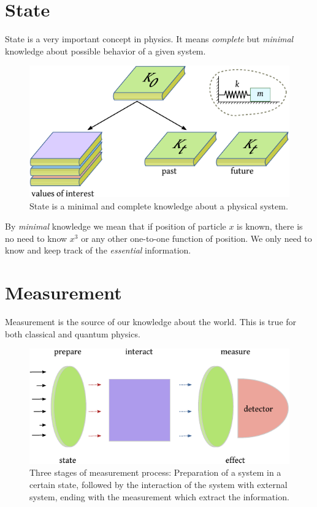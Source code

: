 \section{State}
State is a very important concept in physics. It means \emph{complete} but \emph{minimal} knowledge about  possible behavior of a given system.
\begin{figure}[htbp]
	\centering
	\includegraphics[scale=1.0]{stateAsKnowledge}
	\caption{State is a minimal and complete knowledge about a physical system.}
	\label{fig:stateAsKnowledge}
\end{figure}
By \emph{minimal} knowledge we mean that if position of particle $x$ is known, there is no need to know $x^3$ or any other one-to-one function of position. We only need to know and keep track of the \emph{essential} information.


\section{Measurement}
Measurement is the source of our knowledge about the world. This is true for both classical and quantum physics. 
\begin{figure}[htbp]
	\centering
	\includegraphics[scale=1.0]{measurementStages}
	\caption{Three stages of measurement process: Preparation of a system in a certain state, followed by the interaction of the system with external system, ending with the measurement which extract the information.}
	\label{fig:measurementStages}
\end{figure}


